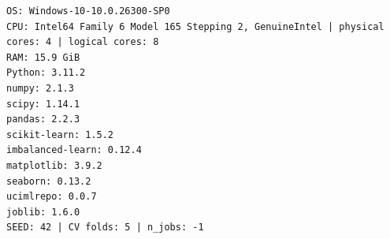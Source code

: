 {\footnotesize
\begin{verbatim}
OS: Windows-10-10.0.26300-SP0
CPU: Intel64 Family 6 Model 165 Stepping 2, GenuineIntel | physical cores: 4 | logical cores: 8
RAM: 15.9 GiB
Python: 3.11.2
numpy: 2.1.3
scipy: 1.14.1
pandas: 2.2.3
scikit-learn: 1.5.2
imbalanced-learn: 0.12.4
matplotlib: 3.9.2
seaborn: 0.13.2
ucimlrepo: 0.0.7
joblib: 1.6.0
SEED: 42 | CV folds: 5 | n_jobs: -1
\end{verbatim}
}
